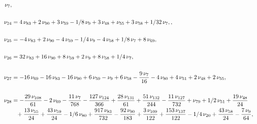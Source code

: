 \documentclass[a4paper,12pt, DIV=14, BCOR=5mm, twoside, headsepline]{scrbook}
\begin{document}
\begin{align}
\begin{aligned}
\nu_{{7}}, \\
\\
\nu_{{24}}&=4\,\nu_{{83}}+2\,\nu_{{90}}+3\,\nu_{{59}}-1/8\,
\nu_{{9}}+3\,\nu_{{48}}+\nu_{{55}}+3\,\nu_{{58}}+1/32\,\nu_{{7}},, \\
\\
\nu_{{25}}&=-4\,\nu_{{83}}+2\,\nu_{{90}}-4\,\nu_{{59}}-1/4\,\nu_{{9}}-4\,\nu
_{{58}}+1/8\,\nu_{{7}}+8\,\nu_{{69}}, \\
\\
\nu_{{26}}&=32\,\nu_{{83}}+16\,\nu_{{90}}+8\,\nu_{{59}}+2\,\nu_{{9}}+8\,\nu_{{58}}+1/4\,\nu_{{7}}, \\
\\
\nu_{{
27}}&=-16\,\nu_{{69}}-16\,\nu_{{83}}-16\,\nu_{{90}}+6\,\nu_{{59}}-\nu_{
{9}}+6\,\nu_{{58}}-{\frac {9\,\nu_{{7}}}{16}}-4\,\nu_{{80}}+4\,\nu_{{
51}}+2\,\nu_{{48}}+2\,\nu_{{55}}, \\
\\
\nu_{{28}}&=-{\frac {29\,\nu_{{108}}}{61}}-2\,\nu_{{69}}-{\frac {11\,\nu_{{7}}}{768}}-{\frac {127\,\nu_{{124}}}{366}}+{\frac {28\,\nu_{{131}}}{61}}+{\frac {51\,\nu_{{132}}}{244}}-{\frac {11\,\nu_{{127}}}{732}}+\nu_{{79}}+1/2\,\nu_{{51}}+{\frac {19\,\nu_{{48}}}{24}}\\
 &\hphantom{=}+{\frac {13\,\nu_{{55}}}{24}}+{\frac {43\,\nu_{{59}}}{24}}-1/6\,\nu_{{80}}+{\frac {917\,\nu_{{83}}}{732}}-{\frac {92\,\nu_
{{90}}}{183}}+{\frac {3\,\nu_{{109}}}{122}}+{\frac {153\,\nu_{{137}}}{
122}}-1/4\,\nu_{{20}}+{\frac {43\,\nu_{{58}}}{24}}-{\frac {7\,\nu_{{9}
}}{64}},
\end{aligned}
\end{align}
\end{document}
